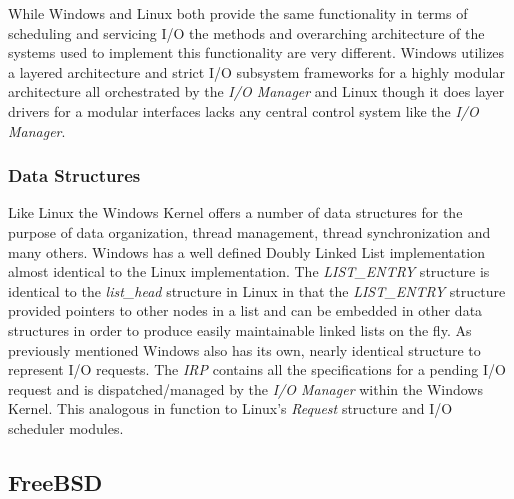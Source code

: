   \normalfont \indent While Windows and Linux both provide the same functionality in terms of scheduling and servicing I/O the methods and overarching architecture of the systems used to implement this functionality are very different. Windows utilizes a layered architecture and strict I/O subsystem frameworks for a highly modular architecture all orchestrated by the \textit{I/O Manager} and Linux though it does layer drivers for a modular interfaces lacks any central control system like the \textit{I/O Manager}. 

  \subsubsection{\bf Data Structures}
  \normalfont \indent Like Linux the Windows Kernel offers a number of data structures for the purpose of data organization, thread management, thread synchronization and many others. Windows has a well defined Doubly Linked List implementation almost identical to the Linux implementation. The \textit{LIST\_ENTRY} structure is identical to the \textit{list\_head} structure in Linux in that the \textit{LIST\_ENTRY} structure provided pointers to other nodes in a list and can be embedded in other data structures in order to produce easily maintainable linked lists on the fly. As previously mentioned Windows also has its own, nearly identical structure to represent I/O requests. The \textit{IRP} contains all the specifications for a pending I/O request and is dispatched/managed by the \textit{I/O Manager} within the Windows Kernel. This analogous in function to Linux’s \textit{Request} structure and I/O scheduler modules.


\subsection{\bf FreeBSD}
